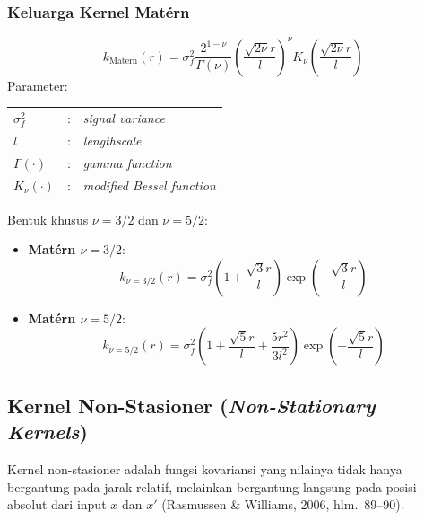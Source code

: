 \documentclass[11pt,a4paper]{article}
\def\mathbf#1{#1}%
\newcommand{\citep}[2][]{(Rasmussen \& Williams, 2006\if\relax\detokenize{#1}\relax\else, #1\fi)}
\begin{document}
\subsubsection{Keluarga Kernel Matérn}
\begin{equation}
k_{\mathrm{Mat\acute{e}rn}}(r) = \sigma_f^2 \frac{2^{1-\nu}}{\Gamma(\nu)} \left( \frac{\sqrt{2\nu} r}{l} \right)^\nu K_\nu\left( \frac{\sqrt{2\nu} r}{l} \right)
\end{equation}
Parameter:
\begin{center}
\begin{tabular}{@{} l c l @{}}
$\sigma_f^2$     & : & \textit{signal variance} \\
$l$              & : & \textit{lengthscale} \\
$\Gamma(\cdot)$  & : & \textit{gamma function} \\
$K_\nu(\cdot)$   & : & \textit{modified Bessel function}
\end{tabular}
\end{center}
Bentuk khusus $\nu = 3/2$ dan $\nu = 5/2$:
\begin{itemize}
    \item \textbf{Matérn $\nu = 3/2$}:
    \begin{equation}
    k_{\nu=3/2}(r) = \sigma_f^2 \left( 1 + \frac{\sqrt{3}r}{l} \right) \exp\left( -\frac{\sqrt{3}r}{l} \right)
    \end{equation}
    \item \textbf{Matérn $\nu = 5/2$}:
    \begin{equation}
    k_{\nu=5/2}(r) = \sigma_f^2 \left( 1 + \frac{\sqrt{5}r}{l} + \frac{5r^2}{3l^2} \right) \exp\left( -\frac{\sqrt{5}r}{l} \right)
    \end{equation}
\end{itemize}

\subsection{Kernel Non-Stasioner (\textit{Non-Stationary Kernels})}
Kernel non-stasioner adalah fungsi kovariansi yang nilainya tidak hanya bergantung pada jarak relatif, melainkan bergantung langsung pada posisi absolut dari input $\mathbf{x}$ dan $\mathbf{x}'$ \citep[hlm.~89--90]{rasmussen2006}.
\end{document}
